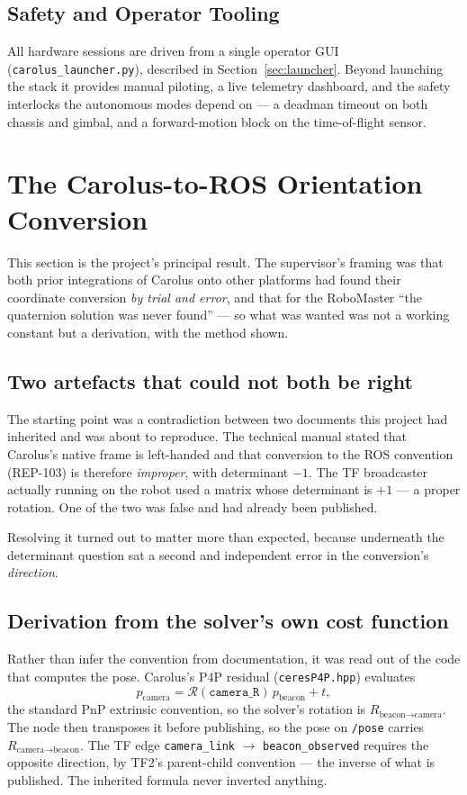\documentclass[11pt]{article}
\begin{document}
\subsection{Safety and Operator Tooling}
All hardware sessions are driven from a single operator GUI
(\texttt{carolus\_launcher.py}), described in Section~\ref{sec:launcher}.
Beyond launching the stack it provides manual piloting, a live telemetry
dashboard, and the safety interlocks the autonomous modes depend on --- a
deadman timeout on both chassis and gimbal, and a forward-motion block on
the time-of-flight sensor.

\section{The Carolus-to-ROS Orientation Conversion}
\label{sec:quaternion}

This section is the project's principal result. The supervisor's framing was
that both prior integrations of Carolus onto other platforms had found their
coordinate conversion \emph{by trial and error}, and that for the RoboMaster
``the quaternion solution was never found'' --- so what was wanted was not a
working constant but a derivation, with the method shown.

\subsection{Two artefacts that could not both be right}

The starting point was a contradiction between two documents this project
had inherited and was about to reproduce. The technical manual stated that
Carolus's native frame is left-handed and that conversion to the ROS
convention (REP-103) is therefore \emph{improper}, with determinant $-1$.
The TF broadcaster actually running on the robot used a matrix whose
determinant is $+1$ --- a proper rotation. One of the two was false and had
already been published.

Resolving it turned out to matter more than expected, because underneath the
determinant question sat a second and independent error in the conversion's
\emph{direction}.

\subsection{Derivation from the solver's own cost function}

Rather than infer the convention from documentation, it was read out of the
code that computes the pose. Carolus's P4P residual
(\texttt{ceresP4P.hpp}) evaluates
\[
p_{\text{camera}} = \mathcal{R}(\texttt{camera\_R})\, p_{\text{beacon}} + t,
\]
the standard PnP extrinsic convention, so the solver's rotation is
$R_{\text{beacon}\rightarrow\text{camera}}$. The node then transposes it
before publishing, so the pose on \texttt{/pose} carries
$R_{\text{camera}\rightarrow\text{beacon}}$. The TF edge
\texttt{camera\_link} $\rightarrow$ \texttt{beacon\_observed} requires the
opposite direction, by TF2's parent-child convention --- the inverse of what
is published. The inherited formula never inverted anything.
\end{document}
